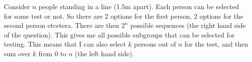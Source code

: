 
\setcounter{theorem}{13}
\begin{exercise}[BH.1.14]
\begin{solution}
	Consider $n$ people standing in a line (1.5m apart). Each person can be selected for some test or not. So there are 2 options for the first person, 2 options for the second person etcetera. There are then $2^n$ possible sequences (the right hand side of the question). This gives me all possible subgroups that can be selected for testing. This means that I can also select $k$ persons out of $n$ for the test, and then sum over $k$ from $0$ to $n$ (the left hand side).
\end{solution}
\end{exercise}


